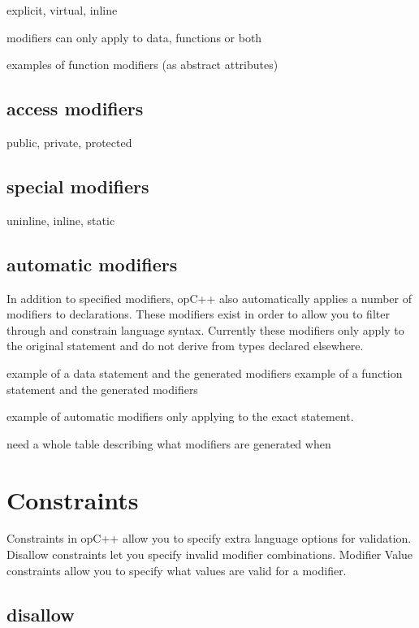 explicit, virtual, inline

modifiers can only apply to data, functions or both

examples of function modifiers (as abstract attributes)

\subsection{ access modifiers }
\label{sec:concepts_access_modifiers}

public, private, protected

\subsection{ special modifiers }
\label{sec:concepts_special_modifiers}

uninline, inline, static

\subsection{ automatic modifiers }
\label{sec:concepts_automatic_modifiers}

In addition to specified modifiers, opC++ also automatically applies
a number of modifiers to declarations.  These modifiers exist in order
to allow you to filter through and constrain language syntax.  Currently
these modifiers only apply to the original statement and do not derive from
types declared elsewhere.

example of a data statement and the generated modifiers
example of a function statement and the generated modifiers

example of automatic modifiers only applying to the exact statement.

need a whole table describing what modifiers are generated when

\section{ Constraints }
\label{sec:concepts_constraints}

Constraints in opC++ allow you to specify extra
language options for validation.  Disallow constraints
let you specify invalid modifier combinations.  Modifier
Value constraints allow you to specify what values
are valid for a modifier.

\subsection{ disallow }
\label{sec:concepts_disallow}

